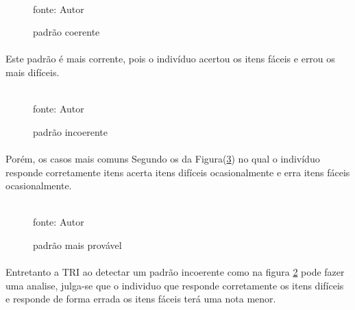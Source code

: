 	\begin{figure}[!h]
		\centering
		\caption{padrão coerente}
		\\
		fonte: Autor
		\label{fig:coerente}
	\end{figure}
	\paragraph{}
	    Este padrão é mais corrente, pois o indivíduo acertou os itens fáceis e errou os mais difíceis.
	\begin{figure}[!h]
		\centering
		\caption{padrão incoerente}
		\\
		fonte: Autor
		\label{fig:incoerente}
	\end{figure}
	\paragraph{}
	    Porém, os casos mais comuns Segundo os da Figura(\ref{fig:coerenciax}) no qual o indivíduo responde corretamente itens acerta itens difíceis ocasionalmente e erra itens fáceis ocasionalmente.
	\begin{figure}[!h]
		\centering
		\caption{padrão mais provável}
		\\
		fonte: Autor
		\label{fig:coerenciax}
	\end{figure}
	\paragraph{}
	    Entretanto a TRI ao detectar um padrão incoerente como na figura  \ref{fig:incoerente} pode fazer uma analise, julga-se que o individuo que responde corretamente os itens difíceis e responde de forma errada os itens fáceis terá uma nota menor.
